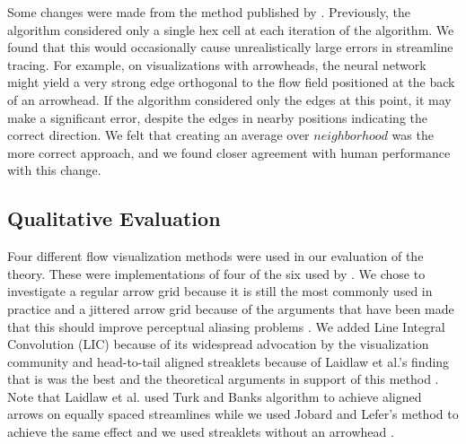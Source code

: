 Some changes were made from the method published by
. Previously, the algorithm considered only a single
hex cell at each iteration of the algorithm. We found that this would
occasionally cause unrealistically large errors in streamline
tracing. For example, on visualizations with arrowheads, the neural
network might yield a very strong edge orthogonal to the flow field
positioned at the back of an arrowhead. If the algorithm considered
only the edges at this point, it may make a significant error,
despite the edges in nearby positions indicating the correct
direction. We felt that creating an average over $neighborhood$ was
the more correct approach, and we found closer agreement with human
performance with this change.

\subsection{Qualitative Evaluation}
Four different flow visualization methods were used in our evaluation
of the theory. These were implementations of four of the six used by
. We chose to investigate a regular arrow grid
because it is still the most commonly used in practice and a jittered
arrow grid because of the arguments that have been made that this
should improve perceptual aliasing problems \cite{Turk1996}. We added
Line Integral Convolution (LIC) because of its widespread advocation
by the visualization community \cite{Cabral1993} and head-to-tail
aligned streaklets because of Laidlaw et al.'s finding that is was
the best and the theoretical arguments in support of this method
\cite{Ware2008}. Note that Laidlaw et al. used Turk and Banks
algorithm to achieve aligned arrows on equally spaced streamlines
while we used Jobard and Lefer's \citeyear{Jobard1997} method to
achieve the same effect and we used streaklets without an arrowhead
\cite{Fowler1989}.

